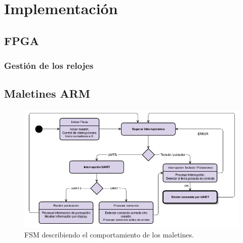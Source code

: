 \section{Implementación}
\label{s3:sec:Implementacion}


\subsection{FPGA}
\label{s3:subsec:fpga}

\subsubsection{Gestión de los relojes}
\label{s3:subsubsec:clocking}


\subsection{Maletines ARM}
\label{s3:subsec:maletines}

\begin{figure}[h]
  \centering
  \includegraphics[width=1.0\textwidth]{images/maletin_fsm.png}
  \caption{FSM describiendo el comportamiento de los maletines.}
  \label{s3:fig:FSM_maletin}
\end{figure}





%
%


